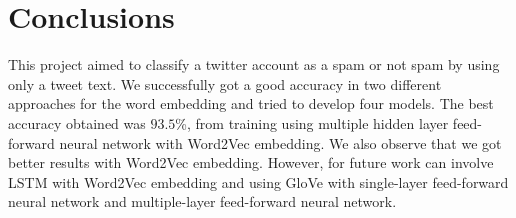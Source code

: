 \section{Conclusions}
This project aimed to classify a twitter account as a spam or not spam by using only a tweet text. We successfully got a good accuracy in two different approaches for the word embedding and tried to develop four models. The best accuracy obtained was $93.5$\%, from training using multiple hidden layer feed-forward neural network with Word2Vec embedding. We also observe that we got better results with Word2Vec embedding. However, for future work can involve LSTM with Word2Vec embedding and using GloVe with single-layer feed-forward neural network and multiple-layer feed-forward neural network.
\label{sec:conclusions}